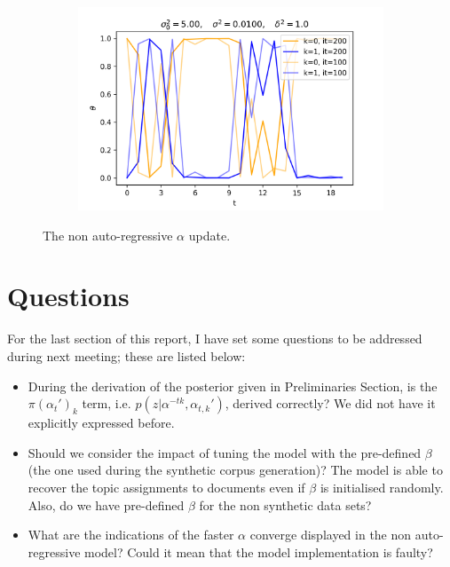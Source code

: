 \documentclass[12pt]{article}
\begin{document}
\begin{figure}[H]
\begin{subfigure}[b]{0.33\textwidth}
  \end{subfigure}%
  \begin{subfigure}[b]{0.33\textwidth}
    \includegraphics[width=\linewidth]{init_5E+00|basic_1E-02|prop_1E+00|it_200|autoreg_False}
  \end{subfigure}
  \caption{The non auto-regressive $\alpha$ update.}
\end{figure}

\section*{Questions}

\par For the last section of this report, I have set some questions to be addressed during next meeting; these are listed below:
\begin{itemize}
  \item During the derivation of the posterior given in Preliminaries Section, is the $\pi(\alpha_{t}')_k$ term, i.e. $p(z|\alpha^{-tk},\alpha_{t, k}')$, derived correctly? We did not have it explicitly expressed before.
  \item Should we consider the impact of tuning the model with the pre-defined $\beta$ (the one used during the synthetic corpus generation)? The model is able to recover the topic assignments to documents even if $\beta$ is initialised randomly. Also, do we have pre-defined $\beta$ for the non synthetic data sets?
  \item What are the indications of the faster $\alpha$ converge displayed in the non auto-regressive model? Could it mean that the model implementation is faulty?
\end{itemize}


%
\end{document}
